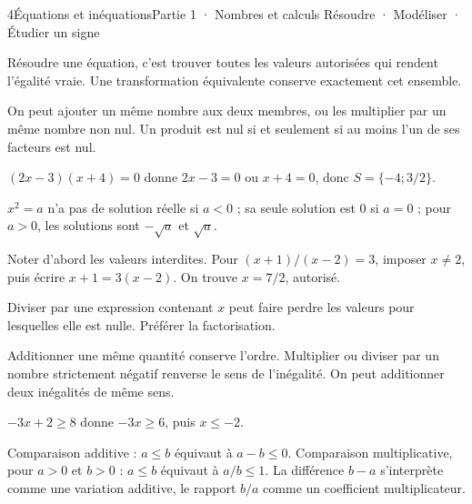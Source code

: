 \begin{ouverture}[courbe]{4}{Équations et inéquations}{Partie 1 · Nombres et calculs}
{Résoudre · Modéliser · Étudier un signe}
\end{ouverture}
\pagestyle{otMain}\essentiel\fontsize{11}{15}\selectfont
{}
\begin{definition}Résoudre une équation, c’est trouver toutes les valeurs autorisées qui rendent l’égalité vraie. Une transformation équivalente conserve exactement cet ensemble.\end{definition}
\begin{propriete}On peut ajouter un même nombre aux deux membres, ou les multiplier par un même nombre non nul. Un produit est nul si et seulement si au moins l’un de ses facteurs est nul.\end{propriete}
\begin{exemple}$(2x-3)(x+4)=0$ donne $2x-3=0$ ou $x+4=0$, donc $S=\{-4;3/2\}$.\end{exemple}
\begin{propriete}$x^2=a$ n’a pas de solution réelle si $a<0$ ; sa seule solution est 0 si $a=0$ ; pour $a>0$, les solutions sont $-\sqrt a$ et $\sqrt a$.\end{propriete}
\begin{savoirfaire}Noter d’abord les valeurs interdites. Pour $(x+1)/(x-2)=3$, imposer $x\ne2$, puis écrire $x+1=3(x-2)$. On trouve $x=7/2$, autorisé.\end{savoirfaire}
\begin{attention}Diviser par une expression contenant $x$ peut faire perdre les valeurs pour lesquelles elle est nulle. Préférer la factorisation.\end{attention}
\clearpage
{}
\begin{propriete}Additionner une même quantité conserve l’ordre. Multiplier ou diviser par un nombre strictement négatif renverse le sens de l’inégalité. On peut additionner deux inégalités de même sens.\end{propriete}
\begin{exemple}$-3x+2\ge8$ donne $-3x\ge6$, puis $x\le-2$.\end{exemple}
\begin{propriete}Comparaison additive : $a\le b$ équivaut à $a-b\le0$. Comparaison multiplicative, pour $a>0$ et $b>0$ : $a\le b$ équivaut à $a/b\le1$. La différence $b-a$ s’interprète comme une variation additive, le rapport $b/a$ comme un coefficient multiplicateur.\end{propriete}
